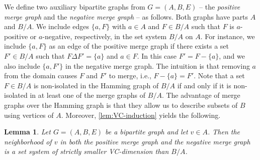 \documentclass[11pt]{article}
\newtheorem{lemma}[theorem]{Lemma}
\theoremstyle{definition}
\newcommand{\inducedSS}[2]{#1/#2}%
\renewcommand{\le}{\leqslant}
\renewcommand{\subset}{\subseteq}
\newcommand{\set}[1]{\{#1\}}
\newcommand{\setof}[2]{\set{#1 \,|\, #2 }}
\DeclareMathOperator{\polylog}{polylog}
\DeclareMathOperator{\subpoly}{subpoly}
\begin{document}
We define two auxiliary bipartite graphs from $G=(A,B,E)$ -- the \emph{positive merge graph} and the \emph{negative merge graph} -- as follows. Both graphs have parts $A$ and $\inducedSS{B}{A}$.
We include edges $\set{a,F}$ with $a\in A$ and  $F\in \inducedSS{B}{A}$ such that $F$ is $a$-positive or $a$-negative, respectively, in the set system $\inducedSS{B}{A}$ on $A$.
For instance, we include $\set{a,F}$ as an edge of the positive merge graph if there exists a set $F' \in \inducedSS{B}{A}$ such that $F \Delta F'=\{a\}$ and $a \in F$. In this case $F'=F-\{a\}$, and we also include $\set{a,F'}$ in the negative merge graph. The intuition is that removing $a$ from the domain causes $F$ and $F'$ to merge, i.e., $F-\{a\}=F'$.
Note that a set $F\in \inducedSS{B}{A}$ is non-isolated in the Hamming graph 
of $\inducedSS{B}{A}$ if and only if it is non-isolated in at least one of the merge graphs of $\inducedSS{B}{A}$.
%  
The advantage of merge graphs over the Hamming graph is that they allow us to describe subsets of $B$ using vertices of $A$. Moreover, \cref{lem:VC-induction} yields the following.

\begin{lemma}
\label{lem:blue-vc}
  Let $G=(A,B,E)$ be a bipartite graph and let  $v\in A$.
  Then the neighborhood of $v$ in both the positive merge graph and the negative merge graph 
  is a set system of  strictly smaller VC-dimension than $\inducedSS{B}{A}$.
\end{lemma}






\end{document}
